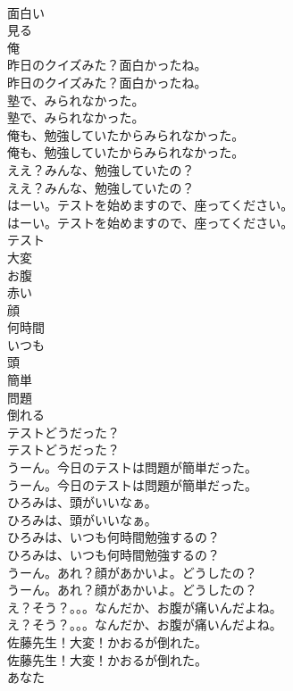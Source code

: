 \documentclass[8pt]{extreport}
\begin{document}
\begin{CJK}{UTF8}{min}
\\	面白い
\\	見る
\\	俺
\\	昨日のクイズみた？面白かったね。	
\\	昨日のクイズみた？面白かったね。 
\\	塾で、みられなかった。	
\\	塾で、みられなかった。 
\\	俺も、勉強していたからみられなかった。	
\\	俺も、勉強していたからみられなかった。 
\\	ええ？みんな、勉強していたの？	
\\	ええ？みんな、勉強していたの？ 
\\	はーい。テストを始めますので、座ってください。	
\\	はーい。テストを始めますので、座ってください。 
\\	テスト
\\	大変
\\	お腹
\\	赤い
\\	顔
\\	何時間
\\	いつも
\\	頭
\\	簡単
\\	問題
\\	倒れる
\\	テストどうだった？	
\\	テストどうだった？ 
\\	うーん。今日のテストは問題が簡単だった。	
\\	うーん。今日のテストは問題が簡単だった。 
\\	ひろみは、頭がいいなぁ。	
\\	ひろみは、頭がいいなぁ。 
\\	ひろみは、いつも何時間勉強するの？	
\\	ひろみは、いつも何時間勉強するの？ 
\\	うーん。あれ？顔があかいよ。どうしたの？	
\\	うーん。あれ？顔があかいよ。どうしたの？ 
\\	え？そう？。。。なんだか、お腹が痛いんだよね。	
\\	え？そう？。。。なんだか、お腹が痛いんだよね。 
\\	佐藤先生！大変！かおるが倒れた。	
\\	佐藤先生！大変！かおるが倒れた。 
\\	あなた

\end{CJK}
\end{document}
